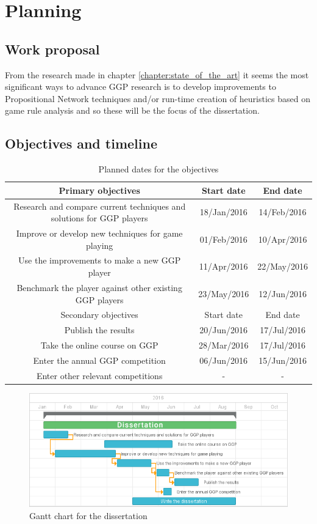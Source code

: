 \section{Planning}

\subsection{Work proposal}
From the research made in chapter \ref{chapter:state_of_the_art} it seems the most significant ways to advance \gls{GGP} research is to develop improvements to Propositional Network techniques and/or run-time creation of heuristics based on game rule analysis and so these will be the focus of the dissertation.

\subsection{Objectives and timeline}

\begin{table}[h]
\caption{Planned dates for the objectives}
\label{table:Planning}
\small
\begin{tabular}{| c | c | c |}
\hline Primary objectives & Start date & End date \\

\hline Research and compare current techniques and solutions for GGP players & 18/Jan/2016 & 14/Feb/2016 \\
\hline Improve or develop new techniques for game playing & 01/Feb/2016 & 10/Apr/2016 \\
\hline Use the improvements to make a new GGP player & 11/Apr/2016 & 22/May/2016 \\
\hline Benchmark the player against other existing GGP players & 23/May/2016 & 12/Jun/2016 \\

\hline Secondary objectives & Start date & End date \\

\hline Publish the results & 20/Jun/2016 & 17/Jul/2016 \\
\hline Take the online course on GGP & 28/Mar/2016 & 17/Jul/2016 \\
\hline Enter the annual GGP competition & 06/Jun/2016 & 15/Jun/2016 \\
\hline Enter other relevant competitions & - & - \\

\hline
\end{tabular}
\end{table}


\begin{figure}[h]
	\centering
    \includegraphics[scale=0.6]{images/gantt.png}
    \caption{Gantt chart for the dissertation}
    \label{fig:gantt}
\end{figure}
